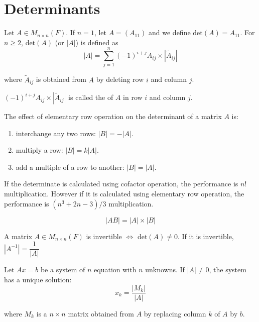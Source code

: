 \section{Determinants}

\begin{definition}
	Let $A \in M_{n \times n} (F)$. If $n =1$, let $A=(A_{11})$ and we define $\text{det}(A) = A_{11}$. For $n \geq 2$, $\text{det}(A)$ (or $|A|$) is defined as
	\begin{equation}
		|A| = \sum_{j=1}^n (-1)^{i + j} A_{ij} \times |\tilde{A}_{ij} |
	\end{equation}
	
	where $\tilde{A}_{ij}$ is obtained from $A$ by deleting row $i$ and column $j$.
	
	$(-1)^{i + j} A_{ij} \times |\tilde{A}_{ij} |$ is called the  of $A$ in row $i$ and column $j$.
\end{definition}


The effect of elementary row operation on the determinant of a matrix $A$ is:
\begin{enumerate}
    \item interchange any two rows: $|B| = - |A|$.
    \item multiply a row: $|B| = k |A|$.
    \item add a multiple of a row to another: $|B| = |A|$.
\end{enumerate}

If the determinate is calculated using cofactor operation, the performance is $n!$ multiplication. However if it is calculated using elementary row operation, the performance is $(n^3 + 2n - 3)/3$ multiplication.

\begin{theorem}
	\begin{equation}
		|AB| = |A| \times |B|
	\end{equation}
\end{theorem}

\begin{theorem}
	A matrix $A \in M_{n \times n}(F)$ is invertible $\Leftrightarrow$ $\text{det}(A) \neq 0$. If it is invertible, $|A^{-1}| = \dfrac{1}{|A|}$
\end{theorem}

\begin{theorem}
	Let $Ax=b$ be a system of $n$ equation with $n$ unknowns. If $|A| \neq 0$, the system has a unique solution:
	\begin{equation}
		x_k = \frac{|M_k|}{|A|}
	\end{equation}
	
	where $M_k$ is a $n\times n$ matrix obtained from $A$ by replacing column $k$ of $A$ by $b$.
\end{theorem}

